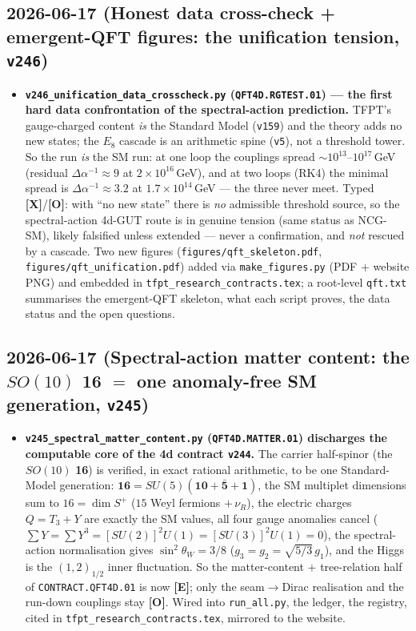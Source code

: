 \documentclass[11pt]{article}
\providecommand{\mE}{\textbf{[E]}}\providecommand{\mC}{\textbf{[C]}}
\providecommand{\mO}{\textbf{[O]}}\providecommand{\mX}{\textbf{[X]}}
\providecommand{\vref}[1]{\texttt{#1}}
\begin{document}
\subsection*{2026-06-17 (Honest data cross-check + emergent-QFT figures: the unification tension, \texttt{v246})}
\begin{itemize}
\item \textbf{\texttt{v246\_unification\_data\_crosscheck.py} (\texttt{QFT4D.RGTEST.01}) --- the first hard
  data confrontation of the spectral-action prediction.} TFPT's gauge-charged content \emph{is} the
  Standard Model (\vref{v159}) and the theory adds no new states; the $E_8$ cascade is an arithmetic spine
  (\vref{v5}), not a threshold tower. So the run \emph{is} the SM run: at one loop the couplings spread
  ${\sim}10^{13}$--$10^{17}$\,GeV (residual $\Delta\alpha^{-1}\approx9$ at $2{\times}10^{16}$\,GeV), and at
  two loops (RK4) the minimal spread is $\Delta\alpha^{-1}\approx3.2$ at $1.7{\times}10^{14}$\,GeV --- the
  three never meet. Typed \mX/\mO: with ``no new state'' there is \emph{no} admissible threshold source, so
  the spectral-action 4d-GUT route is in genuine tension (same status as NCG-SM), likely falsified unless
  extended --- never a confirmation, and \emph{not} rescued by a cascade. Two new figures
  (\texttt{figures/qft\_skeleton.pdf},
  \texttt{figures/qft\_unification.pdf}) added via \texttt{make\_figures.py} (PDF $+$ website PNG) and
  embedded in \texttt{tfpt\_research\_contracts.tex}; a root-level \texttt{qft.txt} summarises the
  emergent-QFT skeleton, what each script proves, the data status and the open questions.
\end{itemize}

\subsection*{2026-06-17 (Spectral-action matter content: the $SO(10)$ \textbf{16} $=$ one anomaly-free SM generation, \texttt{v245})}
\begin{itemize}
\item \textbf{\texttt{v245\_spectral\_matter\_content.py} (\texttt{QFT4D.MATTER.01})
  discharges the computable core of the 4d contract \vref{v244}.} The carrier
  half-spinor (the $SO(10)$ \textbf{16}) is verified, in exact rational arithmetic,
  to be one Standard-Model generation: $\mathbf{16}=SU(5)(\mathbf{10}{+}\bar{\mathbf
  5}{+}\mathbf1)$, the SM multiplet dimensions sum to $16=\dim S^+$ ($15$ Weyl
  fermions $+\,\nu_R$), the electric charges $Q=T_3+Y$ are exactly the SM values,
  all four gauge anomalies cancel ($\sum Y=\sum Y^3=[SU(2)]^2U(1)=[SU(3)]^2U(1)=0$),
  the spectral-action normalisation gives $\sin^2\theta_W=3/8$
  ($g_3=g_2=\sqrt{5/3}\,g_1$), and the Higgs is the $(1,2)_{1/2}$ inner fluctuation.
  So the matter-content $+$ tree-relation half of \texttt{CONTRACT.QFT4D.01} is now
  \mE; only the seam$\to$Dirac realisation and the run-down couplings stay \mO.
  Wired into \texttt{run\_all.py}, the ledger, the registry, cited in
  \texttt{tfpt\_research\_contracts.tex}, mirrored to the website.
\end{itemize}
\end{document}
